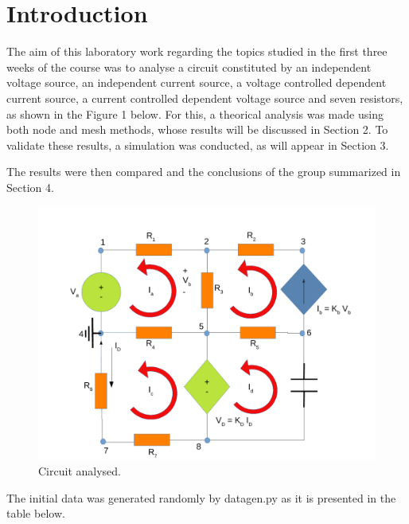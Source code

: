 \section{Introduction}
\label{introduction}

The aim of this laboratory work regarding the topics studied in the first three weeks of the course was to analyse a circuit constituted by an independent voltage source, an independent current source, a voltage controlled dependent current source, a current controlled dependent voltage source and seven resistors, as shown in the Figure 1 below.
 For this, a theorical analysis was made using both node and mesh methods, whose results will be discussed in Section 2. To validate these results, a simulation was conducted, as will appear in Section 3.


The results were then compared and the conclusions of the group summarized in Section 4.


\begin{figure}[ht] \centering
\includegraphics[width=0.9\linewidth]{t2draw.pdf}
\caption{Circuit analysed.}
\label{fig:t2draw}
\end{figure}

The initial data was generated randomly by datagen.py as it is presented in the table below.

